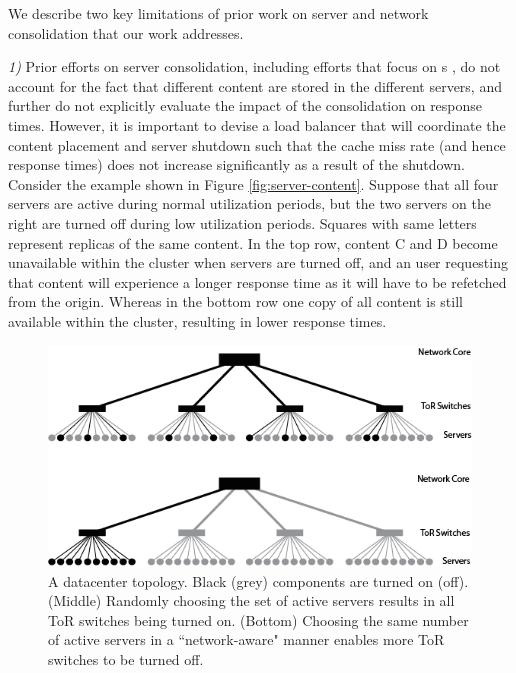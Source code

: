 {We describe two key limitations of prior work on server and network consolidation that our work addresses. 

{\em 1)} Prior efforts on server consolidation, including efforts that focus on \cdc s \cite{mathew12, mathew2014energy},  do not account for the fact that different content are stored in the different servers, and further do not explicitly evaluate the impact of the consolidation on response times. However, it is important to devise a load balancer that will coordinate the content placement and server shutdown such that the cache miss rate (and hence response times) does not increase significantly as a result of the shutdown. Consider the example shown in Figure \ref{fig:server-content}. Suppose that all four servers are active during normal utilization periods, but the two servers on the right are turned off during low utilization periods. Squares with same letters represent replicas of the same content. In the top row, content C and D become unavailable within the cluster when servers are turned off, and  an user requesting that content will experience a longer response time as it will have to be refetched from the origin. Whereas in the bottom row one copy of all content is still available within the cluster, resulting in lower response times.

\begin{figure}
\centering
\includegraphics[scale=0.4]{figures/dcTopology.png}
\caption{A datacenter topology. Black (grey) components are turned on (off). 
(Middle) Randomly choosing the set of active servers results in all ToR switches being turned on.
(Bottom) Choosing the same number of active servers in a ``network-aware" manner enables more ToR switches to be turned off.}
\label{fig:server-network}
\end{figure}


}
